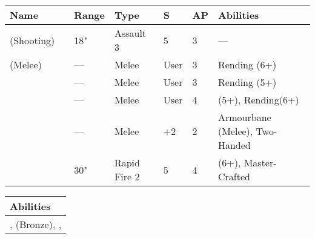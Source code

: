 \noindent
\begin{tabular}{||m{110pt} m{30pt} m{31pt} m{55pt} m{12pt} m{12pt} m{210pt}||}
	\hline
	Name & & Range & Type & S & AP & Abilities \\
	\hline
	\quickref{Staff of Light} (Shooting) & & 18" & Assault 3 & 5 & 3 & — \\
	\quickref{Staff of Light} (Melee) & & — & Melee & User & 3 & Rending (6+) \\
	\quickref{Hyperphase Sword} &  & — & Melee & User & 3 & Rending (5+) \\
	\quickref{Voidblade} &  & — & Melee & User & 4 & \quickref{Entropic Strike} (5+), Rending(6+) \\
	\quickref{Warscythe} &  & — & Melee & +2 & 2 & Armourbane (Melee), Two-Handed \\
	\quickref{Relic Gauss Blaster} & & 30" & Rapid Fire 2 & 5 & 4 & \quickref{Gauss} (6+), Master-Crafted \\
	\hline
\end{tabular}

\noindent
\begin{tabular}{||m{532pt}||}
	\hline
	Abilities \\
	\hline
	\quickref{Command Protocols}, \quickref{Nodal Command}(Bronze), \quickref{Living Metal}, \quickref{Reanimation Protocols} \\
	\hline
\end{tabular}



\newpage
{}

